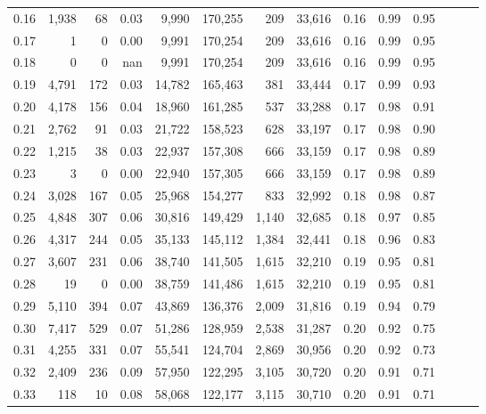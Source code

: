 \begin{tabular}{rrrrrrrrrrrrrr}
0.16 &   1,938 &     68 &  0.03 &    9,990 &  170,255 &     209 &  33,616 &  0.16 &  0.99 &      0.95 \\
0.17 &       1 &      0 &  0.00 &    9,991 &  170,254 &     209 &  33,616 &  0.16 &  0.99 &      0.95 \\
0.18 &       0 &      0 &   nan &    9,991 &  170,254 &     209 &  33,616 &  0.16 &  0.99 &      0.95 \\
0.19 &   4,791 &    172 &  0.03 &   14,782 &  165,463 &     381 &  33,444 &  0.17 &  0.99 &      0.93 \\
0.20 &   4,178 &    156 &  0.04 &   18,960 &  161,285 &     537 &  33,288 &  0.17 &  0.98 &      0.91 \\
0.21 &   2,762 &     91 &  0.03 &   21,722 &  158,523 &     628 &  33,197 &  0.17 &  0.98 &      0.90 \\
0.22 &   1,215 &     38 &  0.03 &   22,937 &  157,308 &     666 &  33,159 &  0.17 &  0.98 &      0.89 \\
0.23 &       3 &      0 &  0.00 &   22,940 &  157,305 &     666 &  33,159 &  0.17 &  0.98 &      0.89 \\
0.24 &   3,028 &    167 &  0.05 &   25,968 &  154,277 &     833 &  32,992 &  0.18 &  0.98 &      0.87 \\
0.25 &   4,848 &    307 &  0.06 &   30,816 &  149,429 &   1,140 &  32,685 &  0.18 &  0.97 &      0.85 \\
0.26 &   4,317 &    244 &  0.05 &   35,133 &  145,112 &   1,384 &  32,441 &  0.18 &  0.96 &      0.83 \\
0.27 &   3,607 &    231 &  0.06 &   38,740 &  141,505 &   1,615 &  32,210 &  0.19 &  0.95 &      0.81 \\
0.28 &      19 &      0 &  0.00 &   38,759 &  141,486 &   1,615 &  32,210 &  0.19 &  0.95 &      0.81 \\
0.29 &   5,110 &    394 &  0.07 &   43,869 &  136,376 &   2,009 &  31,816 &  0.19 &  0.94 &      0.79 \\
0.30 &   7,417 &    529 &  0.07 &   51,286 &  128,959 &   2,538 &  31,287 &  0.20 &  0.92 &      0.75 \\
0.31 &   4,255 &    331 &  0.07 &   55,541 &  124,704 &   2,869 &  30,956 &  0.20 &  0.92 &      0.73 \\
0.32 &   2,409 &    236 &  0.09 &   57,950 &  122,295 &   3,105 &  30,720 &  0.20 &  0.91 &      0.71 \\
0.33 &     118 &     10 &  0.08 &   58,068 &  122,177 &   3,115 &  30,710 &  0.20 &  0.91 &      0.71 \\

\end{tabular}
